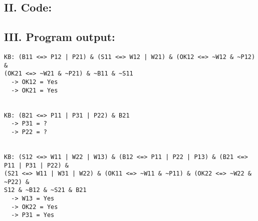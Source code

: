 \documentclass[a4paper]{report}
\begin{document}
\subsection*{II. Code:}


\subsection*{III. Program output:}

\begin{verbatim}
KB: (B11 <=> P12 | P21) & (S11 <=> W12 | W21) & (OK12 <=> ~W12 & ~P12) & 
(OK21 <=> ~W21 & ~P21) & ~B11 & ~S11
  -> OK12 = Yes
  -> OK21 = Yes


KB: (B21 <=> P11 | P31 | P22) & B21
  -> P31 = ?
  -> P22 = ?


KB: (S12 <=> W11 | W22 | W13) & (B12 <=> P11 | P22 | P13) & (B21 <=> P11 | P31 | P22) & 
(S21 <=> W11 | W31 | W22) & (OK11 <=> ~W11 & ~P11) & (OK22 <=> ~W22 & ~P22) & 
S12 & ~B12 & ~S21 & B21
  -> W13 = Yes
  -> OK22 = Yes
  -> P31 = Yes
\end{verbatim}
\end{document}
